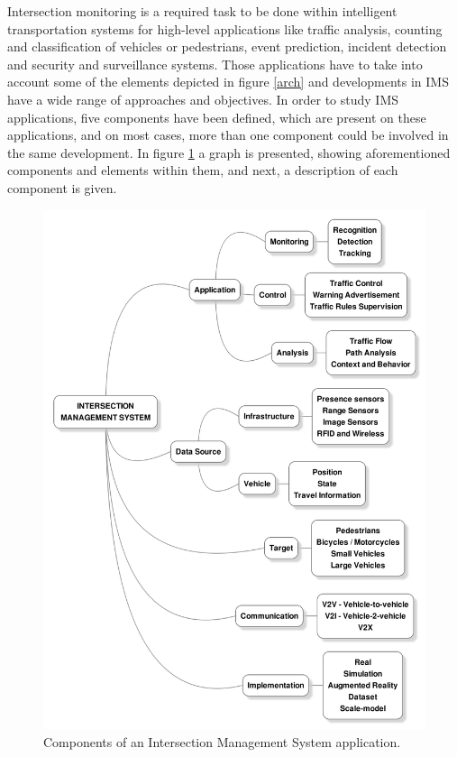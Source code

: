 Intersection monitoring is a required task to be done within intelligent transportation systems for high-level applications like traffic analysis, counting and classification of vehicles or pedestrians, event prediction, incident detection and security and surveillance systems. Those applications have to take into account some of the elements depicted in figure \ref{arch} and developments in IMS have a wide range of approaches and objectives. In order to study IMS applications, five components have been defined, which are present on these applications, and on most cases, more than one component could be involved in the same development. In figure  \ref{imsComps} a graph is presented, showing aforementioned components and elements within them, and next, a description of each component is given.

\begin{figure}[ht!]
\centering
\includegraphics[scale=0.25]{fig/2/ims_graph5.png}
\caption{Components of an Intersection Management System application.}
\label{imsComps}
\end{figure}

